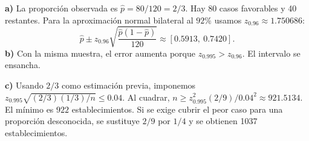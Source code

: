 \textbf{a)} La proporción observada es $\hat p=80/120=2/3$.
Hay 80 casos favorables y 40 restantes. Para la aproximación
normal bilateral al $92\%$ usamos $z_{0.96}\approx1.750686$:
\[
\hat p\pm z_{0.96}\sqrt{\frac{\hat p(1-\hat p)}{120}}
\approx\boxed{[0.5913,\ 0.7420]}.
\]
\textbf{b)} Con la misma muestra, el error aumenta porque
$z_{0.995}>z_{0.96}$. El intervalo se ensancha.

\textbf{c)} Usando $2/3$ como estimación previa, imponemos
$z_{0.995}\sqrt{(2/3)(1/3)/n}\le0.04$. Al cuadrar,
$n\ge z_{0.995}^2(2/9)/0.04^2\approx921.5134$.
El mínimo es $\boxed{922}$ establecimientos. Si se exige
cubrir el peor caso para una proporción desconocida, se sustituye
$2/9$ por $1/4$ y se obtienen 1037 establecimientos.
